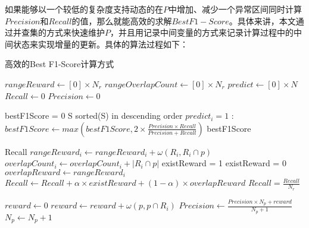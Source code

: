   如果能够以一个较低的复杂度支持动态的在$P$中增加、减少一个异常区间同时计算$Precision$和$Recall$的值，那么就能高效的求解$Best F1-Score$。具体来讲，本文通过并查集的方式来快速维护$P$，并且用记录中间变量的方式来记录计算过程中的中间状态来实现增量的更新。具体的算法过程如下：

  \begin{breakablealgorithm}
    \caption{高效的Best F1-Score计算方式}
    \begin{algorithmic}[1]
      \State $rangeReward \gets [0] \times N_r$
      \State $rangeOverlapCount \gets [0] \times N_r$
      \State $predict \gets [0] \times N$
      \State $Recall \gets 0$
      \State $Precision \gets 0$

      \State

      \State bestF1Score = 0
      \State S \gets sorted(S) in descending order
      \State $predict_i = 1$
          \State {}
          \State {}
      \EndIf
      :
          \State {}
          \State {}
      \EndIf
      \State {}
      \State $bestF1Score \gets max(bestF1Score, 2\times\frac{Precision \times Recall}{Precision + Recall})$
      \EndFor
      \State \Return bestF1Score
      \EndFunction
      
      \State

      \State Recall 
            \State $rangeReward_i \gets rangeReward_i + \omega(R_i,R_i \cap p)$
            \State $overlapCount_i \gets overlapCount_i +  |R_i\cap p|$
              \State existReward = 1
            \Else
              \State existReward = 0
            \EndIf
            \State $overlapReward \gets rangeReward_i$
            \State $Recall \gets Recall + \alpha \times existReward + (1-\alpha) \times overlapReward$
      \EndFor
      \State $Recall = \frac{Recall}{N_r}$

      \State

      \State $reward \gets 0$
            \State $reward \gets reward  + \omega(p, p \cap R_i)$
      \EndFor
      \State $Precision \gets \frac{Precision \times N_p + reward}{N_p + 1}$
      \State $N_p \gets N_p + 1$
      \EndFunction


\end{algorithmic}
\end{breakablealgorithm}
